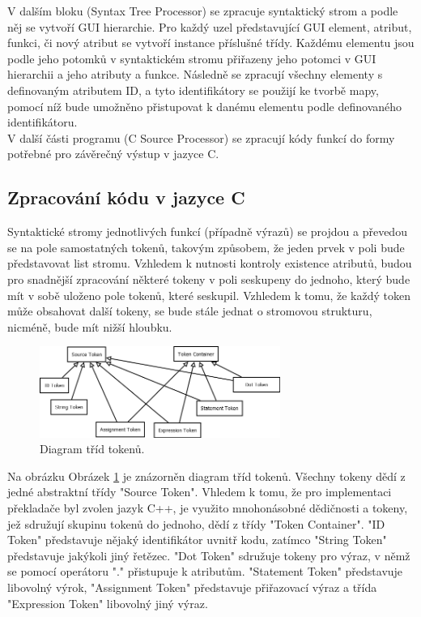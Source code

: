 \documentclass[report,11pt]{elsarticle}
\begin{document}
V dalším bloku (Syntax Tree Processor) se zpracuje syntaktický strom a podle něj se vytvoří GUI hierarchie. Pro každý uzel představující GUI element, atribut, funkci, či nový atribut se vytvoří instance příslušné třídy. Každému elementu jsou podle jeho potomků v syntaktickém stromu přiřazeny jeho potomci v GUI hierarchii a jeho atributy a funkce.
Následně se zpracují všechny elementy s definovaným atributem ID, a tyto identifikátory se použijí ke tvorbě mapy, pomocí níž bude umožněno přistupovat k danému elementu podle definovaného identifikátoru.\\
V další části programu (C Source Processor) se zpracují kódy funkcí do formy potřebné pro závěrečný výstup v jazyce C. 

\subsection{Zpracování kódu v jazyce C}
Syntaktické stromy jednotlivých funkcí (případně výrazů) se projdou a převedou se na pole samostatných tokenů, takovým způsobem, že jeden prvek v poli bude představovat list stromu. Vzhledem k nutnosti kontroly existence atributů, budou pro snadnější zpracování některé tokeny v poli seskupeny do jednoho, který bude mít v sobě uloženo pole tokenů, které seskupil. Vzhledem k tomu, že každý token může obsahovat další tokeny, se bude stále jednat o stromovou strukturu, nicméně, bude mít nižší hloubku.\\
\begin{figure}[!ht]
\begin{center}
  \includegraphics[width=0.7\textwidth]{tokens}
\caption{{\label{fig:fig2}}Diagram tříd tokenů.}
\end{center}
\end{figure}

Na obrázku Obrázek \ref{fig:fig2} je znázorněn diagram tříd tokenů. Všechny tokeny dědí z jedné abstraktní třídy "Source Token". Vhledem k tomu, že pro implementaci překladače byl zvolen jazyk C++, je využito mnohonásobné dědičnosti a tokeny, jež sdružují skupinu tokenů do jednoho, dědí z třídy "Token Container". "ID Token" představuje nějaký identifikátor uvnitř kodu, zatímco "String Token" představuje jakýkoli jiný řetězec. "Dot Token" sdružuje tokeny pro výraz, v němž se pomocí operátoru "." přistupuje k atributům. "Statement Token" představuje libovolný výrok, "Assignment Token" představuje přiřazovací výraz a třída "Expression Token" libovolný jiný výraz.
\end{document}
